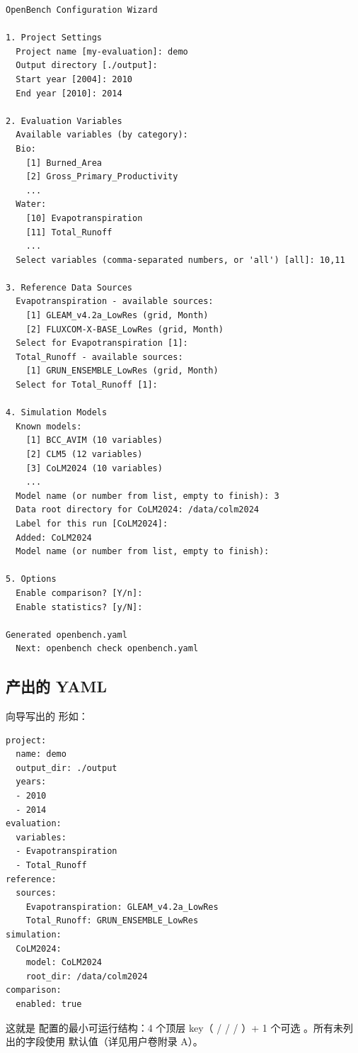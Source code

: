 \begin{exampleBox}[向导对话示例]
\begin{verbatim}
OpenBench Configuration Wizard

1. Project Settings
  Project name [my-evaluation]: demo
  Output directory [./output]:
  Start year [2004]: 2010
  End year [2010]: 2014

2. Evaluation Variables
  Available variables (by category):
  Bio:
    [1] Burned_Area
    [2] Gross_Primary_Productivity
    ...
  Water:
    [10] Evapotranspiration
    [11] Total_Runoff
    ...
  Select variables (comma-separated numbers, or 'all') [all]: 10,11

3. Reference Data Sources
  Evapotranspiration - available sources:
    [1] GLEAM_v4.2a_LowRes (grid, Month)
    [2] FLUXCOM-X-BASE_LowRes (grid, Month)
  Select for Evapotranspiration [1]:
  Total_Runoff - available sources:
    [1] GRUN_ENSEMBLE_LowRes (grid, Month)
  Select for Total_Runoff [1]:

4. Simulation Models
  Known models:
    [1] BCC_AVIM (10 variables)
    [2] CLM5 (12 variables)
    [3] CoLM2024 (10 variables)
    ...
  Model name (or number from list, empty to finish): 3
  Data root directory for CoLM2024: /data/colm2024
  Label for this run [CoLM2024]:
  Added: CoLM2024
  Model name (or number from list, empty to finish):

5. Options
  Enable comparison? [Y/n]:
  Enable statistics? [y/N]:

Generated openbench.yaml
  Next: openbench check openbench.yaml
\end{verbatim}
\end{exampleBox}

\subsection{产出的 YAML}

向导写出的  形如：

\begin{verbatim}
project:
  name: demo
  output_dir: ./output
  years:
  - 2010
  - 2014
evaluation:
  variables:
  - Evapotranspiration
  - Total_Runoff
reference:
  sources:
    Evapotranspiration: GLEAM_v4.2a_LowRes
    Total_Runoff: GRUN_ENSEMBLE_LowRes
simulation:
  CoLM2024:
    model: CoLM2024
    root_dir: /data/colm2024
comparison:
  enabled: true
\end{verbatim}

这就是 \openbench{} 配置的最小可运行结构：4 个顶层 key（ /  /  / ）+ 1 个可选 。所有未列出的字段使用  默认值（详见用户卷附录 A）。

